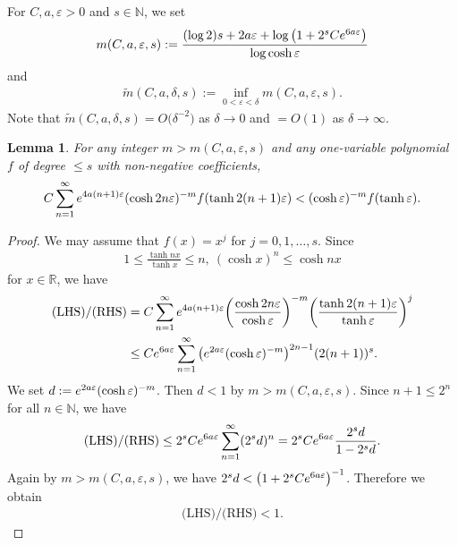 \documentclass[11pt]{article}
\numberwithin{equation}{section}
\numberwithin{equation}{section}
\newtheorem{Lemma}[Theorem]{Lemma}
\begin{document}
For $C,a,\varepsilon > 0$ and $s \in \mathbb{N}$, we set
\begin{align*}%
m(C,a,\varepsilon,s) := \frac{(\log2)s + 2a\varepsilon + \log\big(1+2^{s}C{\rm e}^{6a\varepsilon}\big)}{\log\cosh\varepsilon}
\end{align*}
and
\begin{align*}
\tilde{m}(C,a,\delta,s) :=
\inf_{0<\varepsilon<\delta}m(C,a,\varepsilon,s).
\end{align*}
Note that $\tilde{m}(C,a,\delta,s)=O\big(\delta^{-2}\big)$ as $\delta\to 0$
and $=O(1)$ as $\delta\to \infty$.
\begin{Lemma}\label{koukou}
For any integer $m > m(C,a,\varepsilon,s)$
and any one-variable polynomial $f$ of degree $\leq s$ with non-negative coefficients,
\begin{gather*}
C\sum_{n=1}^{\infty}{\rm e}^{4a(n+1)\varepsilon}(\cosh 2n\varepsilon)^{-m}f(\tanh
2(n+1)\varepsilon) < (\cosh \varepsilon)^{-m}f(\tanh \varepsilon).
\end{gather*}
\end{Lemma}
\begin{proof}
We may assume that $f(x) = x^{j}$ for $j=0,1,\ldots,s$.
Since
\begin{gather*}
1\leq \frac{\tanh nx}{\tanh x} \leq n,\
(\cosh x)^{n} \leq \cosh nx
\end{gather*}
for $x\in\mathbb{R}$, we have
\begin{align*}
\text{(LHS)/(RHS)} &=
C\sum_{n=1}^{\infty}{\rm e}^{4a(n+1)\varepsilon}\bigg(\frac{\cosh 2n
\varepsilon}{\cosh \varepsilon}\bigg)^{-m}\bigg(\frac{\tanh
2(n+1)\varepsilon}{\tanh \varepsilon}\bigg)^j \nonumber
\\
&\leq C{\rm e}^{6a\varepsilon}\sum_{n=1}^{\infty}
\big({\rm e}^{2a\varepsilon}(\cosh \varepsilon)^{-m}\big)^{2n-1}(2(n+1))^s.
\end{align*}
We set $d:={\rm e}^{2a\varepsilon}(\cosh \varepsilon)^{-m}$.
Then $d<1$ by $m>m(C,a,\varepsilon,s)$. Since $n+1\leq 2^{n}$ for all $n\in\mathbb{N}$,
we have
\begin{gather*}
\text{(LHS)/(RHS)}\leq
2^{s}C{\rm e}^{6a\varepsilon}\sum_{n=1}^{\infty} (2^{s}d)^n
= 2^{s}C{\rm e}^{6a\varepsilon}\frac{2^{s}d}{1-2^{s}d}.
\end{gather*}
Again by $m > m(C,a,\varepsilon,s)$,
we have $2^{s}d<\big(1+2^{s}C{\rm e}^{6a\varepsilon}\big)^{-1}$.
Therefore we obtain
\begin{gather*}
\text{(LHS)/(RHS)}<1.\tag*{\qed}
\end{gather*}
\renewcommand{\qed}{}
\end{proof}
\end{document}
